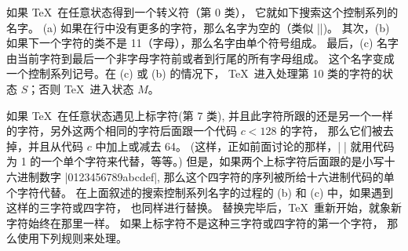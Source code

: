 {%
\ddanger 如果 \TeX\ 在任意状态得到一个转义符（第 0 类），
它就如下搜索这个控制系列的名字。%
(a) 如果在行中没有更多的字符，那么名字为空的（类似 |\csname\endcsname|)。
其次，(b) 如果下一个字符的类不是 11（字母），那么名字由单个符号组成。
最后，(c) 名字由当前字符到最后一个非字母字符前或者到行尾的所有字母组成。
这个名字变成一个控制系列记号。在 (c) 或 (b) 的情况下，
\TeX\ 进入处理第 10 类的字符的状态 $S$；否则 \TeX\ 进入状态 $M$。

\ddanger 如果 \TeX\ 在任意状态遇见上标字符(第 7 类),
并且此字符所跟的还是另一个一样的字符，另外这两个相同的字符后面跟一个代码 $c<128$ 的字符，
\1那么它们被去掉，并且从代码 $c$ 中加上或减去 64。%
(这样，正如前面讨论的那样，|^^A| 就用代码为 1 的一个单个字符来代替，等等。)
但是，如果两个上标字符后面跟的是小写十六进制数字 |0123456789abcdef|,
那么这个四字符的序列被所给十六进制代码的单个字符代替。%
在上面叙述的搜索控制系列名字的过程的 (b) 和 (c) 中，如果遇到这样的三字符或四字符，
也同样进行替换。%
替换完毕后，\TeX\ 重新开始，就象新字符始终在那里一样。%
如果上标字符不是这种三字符或四字符的第一个字符，
那么使用下列规则来处理。

}
